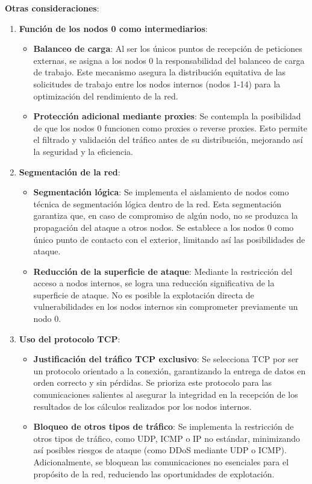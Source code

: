 \documentclass[%
    school=etsisi,%
    degree=61TI,%
]{upm-report}
\begin{document}
\textbf{Otras consideraciones}:
\begin{enumerate}
   \item \textbf{Función de los nodos 0 como intermediarios}:
   \begin{itemize}
        \item \textbf{Balanceo de carga}: Al ser los únicos puntos de recepción de peticiones externas, se asigna a los nodos 0 la responsabilidad del balanceo de carga de trabajo. Este mecanismo asegura la distribución equitativa de las solicitudes de trabajo entre los nodos internos (nodos 1-14) para la optimización del rendimiento de la red.
        \item \textbf{Protección adicional mediante proxies}: Se contempla la posibilidad de que los nodos 0 funcionen como proxies o reverse proxies. Esto permite el filtrado y validación del tráfico antes de su distribución, mejorando así la seguridad y la eficiencia.
   \end{itemize}
   \item \textbf{Segmentación de la red}:
   \begin{itemize}
        \item \textbf{Segmentación lógica}: Se implementa el aislamiento de nodos como técnica de segmentación lógica dentro de la red. Esta segmentación garantiza que, en caso de compromiso de algún nodo, no se produzca la propagación del ataque a otros nodos. Se establece a los nodos 0 como único punto de contacto con el exterior, limitando así las posibilidades de ataque.
        \item \textbf{Reducción de la superficie de ataque}: Mediante la restricción del acceso a nodos internos, se logra una reducción significativa de la superficie de ataque. No es posible la explotación directa de vulnerabilidades en los nodos internos sin comprometer previamente un nodo 0.
   \end{itemize}
   \item \textbf{Uso del protocolo TCP}:
   \begin{itemize}
        \item \textbf{Justificación del tráfico TCP exclusivo}: Se selecciona TCP por ser un protocolo orientado a la conexión, garantizando la entrega de datos en orden correcto y sin pérdidas. Se prioriza este protocolo para las comunicaciones salientes al asegurar la integridad en la recepción de los resultados de los cálculos realizados por los nodos internos.
        \item \textbf{Bloqueo de otros tipos de tráfico}: Se implementa la restricción de otros tipos de tráfico, como UDP, ICMP o IP no estándar, minimizando así posibles riesgos de ataque (como DDoS mediante UDP o ICMP). Adicionalmente, se bloquean las comunicaciones no esenciales para el propósito de la red, reduciendo las oportunidades de explotación.
   \end{itemize}
\end{enumerate}
\end{document}

